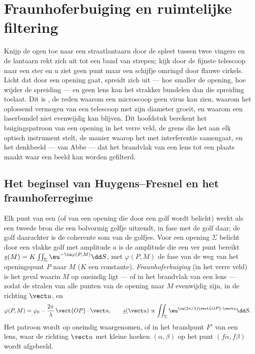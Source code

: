 \chapter{Fraunhoferbuiging en ruimtelijke filtering}\label{ch:b2:diffraction}

Knijp de ogen toe naar een straatlantaarn door de spleet tussen twee
vingers en de lantaarn rekt zich uit tot een band van strepen; kijk
door de fijnste telescoop naar een ster en u ziet geen punt maar een
schijfje omringd door flauwe cirkels. Licht dat door een opening gaat,
spreidt zich uit --- hoe smaller de opening, hoe wijder de spreiding
--- en geen lens kan het strakker bundelen dan die spreiding toelaat.
Dit is \emph{}, de reden waarom een microscoop geen virus kan
zien, waarom het oplossend vermogen van een telescoop met zijn
diameter groeit, en waarom een laserbundel niet evenwijdig kan
blijven. Dit hoofdstuk berekent het buigingspatroon van een opening in
het verre veld, de grens die het aan elk optisch instrument stelt, de
manier waarop het met interferentie samengaat, en het denkbeeld ---
van Abbe --- dat het brandvlak van een lens tot een plaats maakt waar
een beeld kan worden gefilterd.

\section{Het beginsel van Huygens--Fresnel en het fraunhoferregime}

\begin{definition}\label{def:b2:diffraction:huygens}
Elk punt van een  (of van een opening die door een golf wordt
belicht) werkt als een tweede bron die een bolvormig golfje uitzendt, in
fase met de golf daar; de golf daarachter is de coherente som van de
golfjes. Voor een opening $\Sigma$ belicht door een vlakke golf met amplitude $a$
is de amplitude die een ver punt bereikt
$\underline s(M) = K\iint_\Sigma\eu^{-\iu\varphi(P, M)}\dd S$, met
$\varphi(P, M)$ de fase van de weg van het openingspunt $P$ naar $M$
($K$ een constante). \emph{Fraunhoferbuiging} (in het verre veld) is het geval
waarin $M$ op oneindig ligt --- of in het brandvlak van een lens --- zodat
de stralen van alle punten van de opening naar $M$ evenwijdig zijn, in
de richting $\vect u$, en
\[
\varphi(P, M) = \varphi_0 - \frac{2\pi}\lambda\,\vect{OP}\cdot\vect u , \qquad
\underline s(\vect u) \propto \iint_\Sigma\eu^{\iu(2\pi/\lambda)\vect{OP}\cdot\vect u}\dd S .
\]
Het patroon wordt op oneindig waargenomen, of in het brandpunt $F'$ van een lens,
waar de richting $\vect u$ met kleine hoeken $(\alpha, \beta)$ op het
punt $(f\alpha, f\beta)$ wordt afgebeeld.
\end{definition}
\admitted

